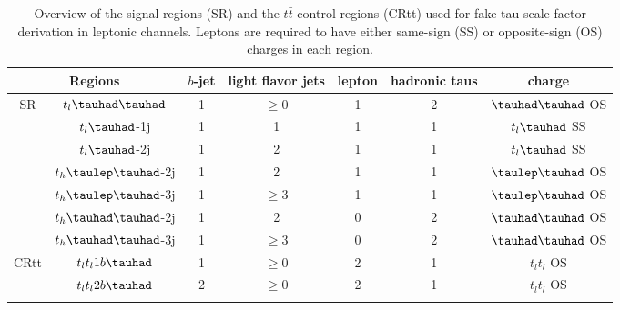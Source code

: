 \documentclass[PAPER, coverpage, atlasdraft=true, texlive=2016, UKenglish]{\ATLASLATEXPATH atlasdoc}
\providecommand{\DIFadd}[1]{{\protect\color{blue}\uwave{#1}}} %
\providecommand{\DIFdel}[1]{{\protect\color{red}\sout{#1}}}                      %
\providecommand{\DIFaddend}{} %
\providecommand{\DIFaddFL}[1]{\DIFadd{#1}} %
\providecommand{\DIFdelFL}[1]{\DIFdel{#1}} %
\providecommand{\DIFaddbeginFL}{} %
\providecommand{\DIFaddendFL}{} %
\providecommand{\DIFdelbeginFL}{} %
\providecommand{\DIFdelendFL}{} %
\begin{document}
\DIFaddend \begin{table}
\centering
\caption{Overview of the signal regions (SR) and the $t\bar{t}$ control regions (CRtt) used for fake tau scale factor derivation in leptonic channels. Leptons are required to have either same-sign (SS) or opposite-sign (OS) charges in each region.}
\label{tab:srcr}
\begin{tabular}[h]{c|c|c|c|c|c|c}
\hline \hline
\multicolumn{2}{c|}{Regions} & $b$-jet & light flavor jets        & lepton & hadronic taus & charge\\ \hline
\multirow{7}{*}{SR}&\DIFdelbeginFL \DIFdelFL{$t_l\thadhad$     }\DIFdelendFL \DIFaddbeginFL \DIFaddFL{$t_{\ell}\thadhad$     }\DIFaddendFL & 1     & $\ge0$                                & 1      & 2             & $\thadhad$ OS\\ \cline{2-7}
&\DIFdelbeginFL \DIFdelFL{$t_l\tauhad$}\DIFdelendFL \DIFaddbeginFL \DIFaddFL{$t_{\ell}\tauhad$}\DIFaddendFL -1j  & 1     & 1                                   & 1      & 1                     & \DIFdelbeginFL \DIFdelFL{$t_l\tauhad$ }\DIFdelendFL \DIFaddbeginFL \DIFaddFL{$t_{\ell}\tauhad$ }\DIFaddendFL SS\\ \cline{2-7}
&\DIFdelbeginFL \DIFdelFL{$t_l\tauhad$}\DIFdelendFL \DIFaddbeginFL \DIFaddFL{$t_{\ell}\tauhad$}\DIFaddendFL -2j  & 1     & 2                                        & 1      & 1                     & \DIFdelbeginFL \DIFdelFL{$t_l\tauhad$ }\DIFdelendFL \DIFaddbeginFL \DIFaddFL{$t_{\ell}\tauhad$ }\DIFaddendFL SS\\ \cline{2-7}
&$t_h\tlhad$-2j   & 1     & 2                           & 1      & 1             & $\tlhad$ OS\\ \cline{2-7}
&$t_h\tlhad$-3j   & 1     & $\ge3$                      & 1      & 1             & $\tlhad$ OS\\ \cline{2-7}
&$t_h\thadhad$-2j & 1     & 2                            & 0      & 2             & $\thadhad$ OS\\ \cline{2-7}
&$t_h\thadhad$-3j & 1     & $\ge3$                       & 0      & 2             & $\thadhad$ OS\\ \hline
\multirow{6}{*}{CRtt}&\DIFdelbeginFL \DIFdelFL{$t_lt_l1b\tauhad$ }\DIFdelendFL \DIFaddbeginFL \DIFaddFL{$t_{\ell}t_{\ell}1b\tauhad$ }\DIFaddendFL & 1     & $\ge0$                            & 2      & 1                     & \DIFdelbeginFL \DIFdelFL{$t_lt_l$ }\DIFdelendFL \DIFaddbeginFL \DIFaddFL{$t_{\ell}t_{\ell}$ }\DIFaddendFL OS\\ \cline{2-7}
&\DIFdelbeginFL \DIFdelFL{$t_lt_l2b\tauhad$      }\DIFdelendFL \DIFaddbeginFL \DIFaddFL{$t_{\ell}t_{\ell}2b\tauhad$      }\DIFaddendFL & 2     & $\ge0$                            & 2      & 1                     & \DIFdelbeginFL \DIFdelFL{$t_lt_l$ }\DIFdelendFL \DIFaddbeginFL \DIFaddFL{$t_{\ell}t_{\ell}$ }\DIFaddendFL OS\\ \cline{2-7}

\end{tabular}
\end{table}
\end{document}

